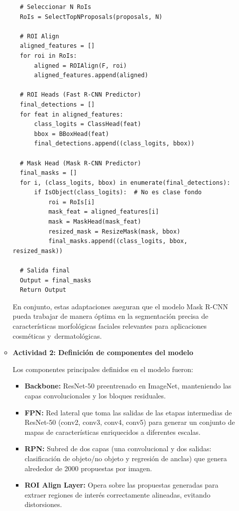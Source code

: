 \begin{enumerate}
\begin{itemize}
\begin{verbatim}
  # Seleccionar N RoIs
  RoIs = SelectTopNProposals(proposals, N)
  
  # ROI Align
  aligned_features = []
  for roi in RoIs:
      aligned = ROIAlign(F, roi)
      aligned_features.append(aligned)
  
  # ROI Heads (Fast R-CNN Predictor)
  final_detections = []
  for feat in aligned_features:
      class_logits = ClassHead(feat)
      bbox = BBoxHead(feat)
      final_detections.append((class_logits, bbox))
  
  # Mask Head (Mask R-CNN Predictor)
  final_masks = []
  for i, (class_logits, bbox) in enumerate(final_detections):
      if IsObject(class_logits):  # No es clase fondo
          roi = RoIs[i]
          mask_feat = aligned_features[i]
          mask = MaskHead(mask_feat)
          resized_mask = ResizeMask(mask, bbox)
          final_masks.append((class_logits, bbox, resized_mask))
  
  # Salida final
  Output = final_masks
  Return Output
  \end{verbatim}
  


\vspace{0.5cm}


En conjunto, estas adaptaciones aseguran que el modelo Mask R-CNN pueda trabajar de manera óptima en la segmentación precisa de características morfológicas faciales relevantes para aplicaciones cosméticas y dermatológicas.
  \item\textbf{Actividad 2: Definición de componentes del modelo}
  
Los componentes principales definidos en el modelo fueron:

\begin{itemize}
    \item \textbf{Backbone:} ResNet-50 preentrenado en ImageNet, manteniendo las capas convolucionales y los bloques residuales. 
    
    \item \textbf{FPN:} Red lateral que toma las salidas de las etapas intermedias de ResNet-50 (conv2, conv3, conv4, conv5) para generar un conjunto de mapas de características enriquecidos a diferentes escalas.
    
    \item \textbf{RPN:} Subred de dos capas (una convolucional y dos salidas: clasificación de objeto/no objeto y regresión de anclas) que genera alrededor de 2000 propuestas por imagen.
    
    \item \textbf{ROI Align Layer:} Opera sobre las propuestas generadas para extraer regiones de interés correctamente alineadas, evitando distorsiones.
    

\end{itemize}
\end{itemize}
\end{enumerate}
